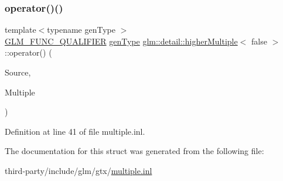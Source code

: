 \subsubsection{\texorpdfstring{operator()()}{operator()()}}
{\footnotesize\ttfamily template$<$typename gen\+Type $>$ \\
\hyperlink{setup_8hpp_a33fdea6f91c5f834105f7415e2a64407}{G\+L\+M\+\_\+\+F\+U\+N\+C\+\_\+\+Q\+U\+A\+L\+I\+F\+I\+ER} \hyperlink{structglm_1_1detail_1_1gen_type}{gen\+Type} \hyperlink{structglm_1_1detail_1_1higher_multiple}{glm\+::detail\+::higher\+Multiple}$<$ false $>$\+::operator() (\begin{DoxyParamCaption}\item[{\hyperlink{structglm_1_1detail_1_1gen_type}{gen\+Type} const \&}]{Source,  }\item[{\hyperlink{structglm_1_1detail_1_1gen_type}{gen\+Type} const \&}]{Multiple }\end{DoxyParamCaption})\hspace{0.3cm}{\ttfamily [inline]}}



Definition at line 41 of file multiple.\+inl.



The documentation for this struct was generated from the following file\+:\begin{DoxyCompactItemize}
\item 
third-\/party/include/glm/gtx/\hyperlink{multiple_8inl}{multiple.\+inl}\end{DoxyCompactItemize}
